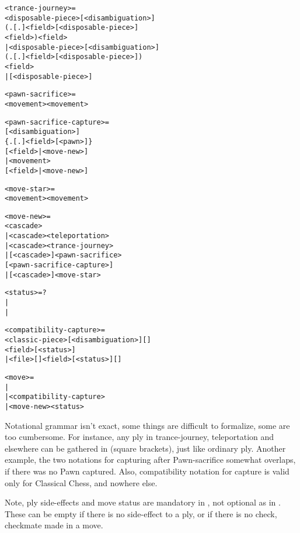 \clearpage %

\begin{alltt}
<trance-journey> =
  <disposable-piece>[<disambiguation>]
    (.[.]<field>\alg{<}[<disposable-piece>]
    <field>)<field>
| <disposable-piece>[<disambiguation>]
    (.[.]<field>\alg{*}[<disposable-piece>])
    <field>
| [<disposable-piece>]

<pawn-sacrifice> =
  <movement><movement>\alg{::}

<pawn-sacrifice-capture> =
  [<disambiguation>]
    \{.[.]<field>[\alg{*}<pawn>]\}
    [\alg{|}<field>|\alg{~}<move-new>]
| <movement>
    [\alg{|}<field>|\alg{~}<move-new>]

<move-star> =
  <movement>\alg{~}<movement>

<move-new> =
  <cascade>
| <cascade><teleportation>
| <cascade><trance-journey>
| [<cascade>\alg{~}]<pawn-sacrifice>
    [<pawn-sacrifice-capture>]
| [<cascade>\alg{~}]<move-star>

<status> = ?
         | \alg{+}
         | \alg{#}
\end{alltt}

\clearpage %

\begin{alltt}
<compatibility-capture> =
  <classic-piece>[<disambiguation>][]
    <field>[<status>]
| <file>[]<field>[<status>][]

<move> =
  \alg{(=)}
| 
| <compatibility-capture>
| <move-new><status>
\end{alltt}

Notational grammar isn't exact, some things are difficult to formalize, some are
too cumbersome. For instance, any ply in trance-journey, teleportation and
elsewhere can be gathered in \alg{[ ]} (square brackets), just like ordinary ply.
Another example, the two notations for capturing after Pawn-sacrifice somewhat
overlaps, if there was no Pawn captured. Also, compatibility notation for capture
is valid only for Classical Chess, and nowhere else.

Note, ply side-effects and move status are mandatory in , not optional
as in . These can be empty if there is no side-effect to a ply, or if
there is no check, checkmate made in a move.

\clearpage %
